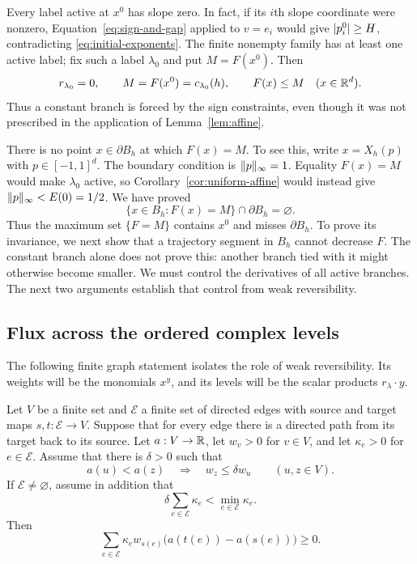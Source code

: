 Every label active at $x^0$ has slope zero. In fact, if its $i$th slope
coordinate were nonzero, Equation~\eqref{eq:sign-and-gap} applied to
$v=e_i$ would give $\lvert p_i^0\rvert\ge H$, contradicting
\eqref{eq:initial-exponents}. The finite nonempty family has at least
one active label; fix such a label $\lambda_0$ and put $M=F(x^0)$. Then
\begin{equation}\label{eq:ceiling}
 r_{\lambda_0}=0,
 \qquad M=F(x^0)=c_{\lambda_0}(h),
 \qquad F(x)\le M\quad(x\in\mathbb R^d).
\end{equation}
Thus a constant branch is forced by the sign constraints, even though it
was not prescribed in the application of Lemma~\ref{lem:affine}.

There is no point $x\in\partial B_h$ at which $F(x)=M$. To see this,
write $x=X_h(p)$ with $p\in[-1,1]^d$. The boundary condition is
$\lVert p\rVert_\infty=1$. Equality $F(x)=M$ would make $\lambda_0$ active,
so Corollary~\ref{cor:uniform-affine} would instead give
$\lVert p\rVert_\infty<E(0)=1/2$. We have proved
\begin{equation}\label{eq:no-boundary-plateau}
 \{x\in B_h:F(x)=M\}\cap\partial B_h=\varnothing.
\end{equation}
Thus the maximum set $\{F=M\}$ contains $x^0$ and misses
$\partial B_h$. To prove its invariance, we next show that a trajectory
segment in $B_h$ cannot decrease $F$. The constant branch alone does not prove this: another branch tied
with it might otherwise become smaller. We must control the derivatives
of all active branches. The next two arguments establish that control
from weak reversibility.

\subsection{Flux across the ordered complex levels}

The following finite graph statement isolates the role of weak
reversibility. Its weights will be the monomials $x^y$, and its levels
will be the scalar products $r_\lambda\cdot y$.

\begin{lemma}\label{lem:cut-flux}
Let $V$ be a finite set and $\mathcal E$ a finite set of directed edges
with source and target maps $s,t:\mathcal E\to V$. Suppose that for
every edge there is a directed path from its target back to its source.
Let $a:V\to\mathbb R$, let $w_v>0$ for $v\in V$, and let
$\kappa_e>0$ for $e\in\mathcal E$. Assume that there is $\delta>0$
such that
\begin{equation}\label{eq:abstract-weight-order}
 a(u)<a(z)\quad\Longrightarrow\quad w_z\le\delta w_u
 \qquad(u,z\in V).
\end{equation}
If $\mathcal E\ne\varnothing$, assume in addition that
\[
 \delta\sum_{e\in\mathcal E}\kappa_e
 <\min_{e\in\mathcal E}\kappa_e.
\]
Then
\[
 \sum_{e\in\mathcal E}
 \kappa_e w_{s(e)}\bigl(a(t(e))-a(s(e))\bigr)\ge0.
\]
\end{lemma}

